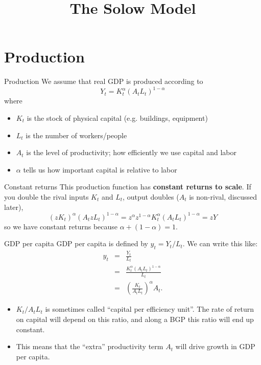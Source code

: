 

\title[Solow Model]{The Solow Model}



\maketitle

\section{Production}
\begin{frame}{Production}
We assume that real GDP is produced according to
\begin{equation}
	Y_t = K_t^{\alpha} (A_tL_t)^{1-\alpha} \label{EQ_Production}
\end{equation}
where
\begin{itemize}
	\item $K_t$ is the stock of physical capital (e.g. buildings, equipment)
	\item $L_t$ is the number of workers/people
	\item $A_t$ is the level of productivity; how efficiently we use capital and labor
	\item $\alpha$ tells us how important capital is relative to labor
\end{itemize}
\end{frame}


\begin{frame}{Constant returns}
\vspace{.25in}\noindent This production function has \textbf{constant returns to scale}. If you double the rival inputs $K_t$ and $L_t$, output doubles ($A_t$ is non-rival, discussed later),
\begin{equation}
(zK_t)^{\alpha} (A_t z L_t)^{1-\alpha} = z^{\alpha}z^{1-\alpha} K_t^{\alpha} (A_tL_t)^{1-\alpha} = zY
\end{equation}
so we have constant returns because $\alpha + (1-\alpha) = 1$.
\end{frame}


\begin{frame}{GDP per capita}
GDP per capita is defined by $y_t = Y_t/L_t$. We can write this like:
\begin{eqnarray}
y_t &=& \frac{Y_t}{L_t} \nonumber \\ 
  &=& \frac{K_t^{\alpha}(A_tL_t)^{1-\alpha}}{L_t} \nonumber \\ 
  &=& \left(\frac{K_t}{A_t L_t}\right)^{\alpha} A_t \label{EQ_y_KAL}.
\end{eqnarray}
\begin{itemize}
	\item $K_t/A_tL_t$ is sometimes called ``capital per efficiency unit''. The rate of return on capital will depend on this ratio, and along a BGP this ratio will end up constant. 
	\item This means that the ``extra'' productivity term $A_t$ will drive growth in GDP per capita.
\end{itemize}

\end{frame}

